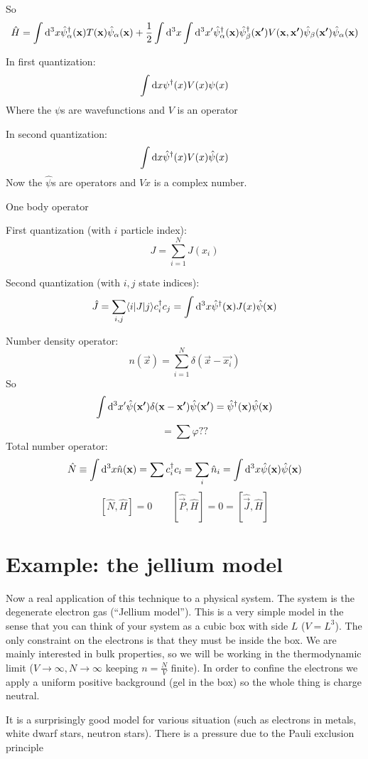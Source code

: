 So 
\[ \hat{H} = \int \operatorname{d \!}{^3x} \hat{\psi}_\alpha^\dagger(\bm{\mathrm{x}})T(\bm{\mathrm{x}})\hat{\psi}_\alpha(\bm{\mathrm{x}}) + \frac{1}{2}\int \operatorname{d \!}{^3x}\int \operatorname{d \!}{^3x'}\hat{\psi}_\alpha^\dagger(\bm{\mathrm{x}})\hat{\psi}_\beta^\dagger(\bm{\mathrm{x'}})V(\bm{\mathrm{x}}, \bm{\mathrm{x'}})\hat{\psi}_\beta(\bm{\mathrm{x'}})\hat{\psi}_\alpha(\bm{\mathrm{x}}) \]

In first quantization:
\[ \int \operatorname{d \!}{x}\psi^\dagger(x)V(x)\psi(x) \]
Where the $\psi$s are wavefunctions and $V$ is an operator

In second quantization:
\[ \int \operatorname{d \!}{x}\hat{\psi}^\dagger(x)V(x)\hat{\psi}(x) \]
Now the $\hat{\psi}$s are operators and $V{x}$ is a complex number.

One body operator

First quantization (with $i$ particle index):
\[ J = \sum^N_{i=1} J(x_i) \]

Second quantization (with $i,j$ state indices):
\[ \hat{J} = \sum_{i,j}\braket[J]{i}{j}c^\dagger_i c_j = \int \diff{^3x}\hat{\psi}^\dagger(\vec{x})J(x)\hat{\psi}(\vec{x}) \]

Number density operator:
\[ n(\vec{x}) = \sum^N_{i=1} \delta(\vec{x}- \vec{x_i}) \]
So
\[ \int \operatorname{d \!}{^3x'}\hat{\psi}(\bm{\mathrm{x'}})\delta(\bm{\mathrm{x}}- \bm{\mathrm{x'}})\hat{\psi}(\bm{\mathrm{x'}}) = \hat{\psi}^\dagger(\bm{\mathrm{x}})\hat{\psi}(\bm{\mathrm{x}}) \]
\[ = \sum \varphi ??\]
Total number operator:
\[ \hat{N} \equiv \int \operatorname{d \!}{^3x}\hat{n}(\bm{\mathrm{x}}) = \sum c^\dagger_i c_i = \sum_i\hat{n}_i = \int \operatorname{d \!}{^3x}\hat{\psi}(\bm{\mathrm{x}})\hat{\psi}(\bm{\mathrm{x}}) \]
\[ \left[\hat{N}, \hat{H}\right] = 0 \qquad \left[\hat{\vec{P}}, \hat{H}\right] = 0 = \left[\hat{\vec{J}}, \hat{H}\right] \]

\section{Example: the jellium model}
Now a real application of this technique to a physical system. The system is the degenerate electron gas (``Jellium model''). This is a very simple model in the sense that you can think of your system as a cubic box with side $L$ ($V=L^3$). The only constraint on the electrons is that they must be inside the box. We are mainly interested in bulk properties, so we will be working in the thermodynamic limit ($V\to\infty, N\to\infty$ keeping $n = \frac{N}{V}$ finite). In order to confine the electrons we apply a uniform positive background (gel in the box) so the whole thing is charge neutral. 

It is a surprisingly good model for various situation (such as electrons in metals, white dwarf stars, neutron stars). There is a pressure due to the Pauli exclusion principle

